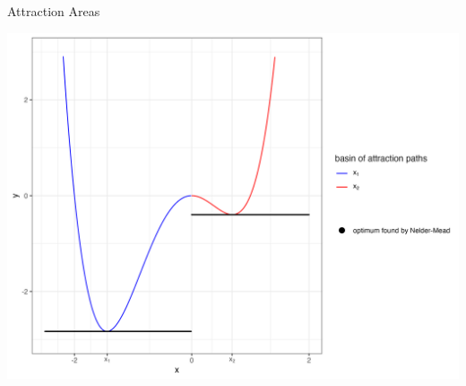 \documentclass[11pt,compress,t,notes=noshow, xcolor=table]{beamer}
\begin{document}
\begin{vbframe}{Attraction Areas}

\begin{center}
\includegraphics[width=1\textwidth]{figure_man/metropolis-example-nelder.png}
\end{center}




\end{vbframe}
\end{document}
